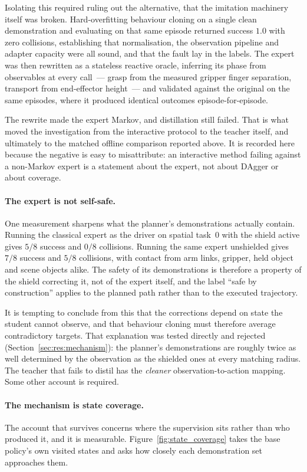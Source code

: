 \documentclass[a4paper,11pt]{report}
\begin{document}
Isolating this required ruling out the alternative, that the imitation machinery itself was broken.
Hard-overfitting behaviour cloning on a single clean demonstration and evaluating on that same
episode returned success $1.0$ with zero collisions, establishing that normalisation, the
observation pipeline and adapter capacity were all sound, and that the fault lay in the labels. The
expert was then rewritten as a stateless reactive oracle, inferring its phase from observables at
every call~--- grasp from the measured gripper finger separation, transport from end-effector
height~--- and validated against the original on the same episodes, where it produced identical
outcomes episode-for-episode.

The rewrite made the expert Markov, and distillation still failed. That is what moved the
investigation from the interactive protocol to the teacher itself, and ultimately to the matched
offline comparison reported above. It is recorded here because the negative is easy to misattribute:
an interactive method failing against a non-Markov expert is a statement about the expert, not about
DAgger or about coverage.

\paragraph{The expert is not self-safe.}
One measurement sharpens what the planner's demonstrations actually contain. Running the classical
expert as the driver on spatial task~0 with the shield active gives $5/8$ success and $0/8$
collisions. Running the same expert unshielded gives $7/8$ success and $5/8$ collisions, with
contact from arm links, gripper, held object and scene objects alike. The safety of its
demonstrations is therefore a property of the shield correcting it, not of the expert itself, and
the label ``safe by construction'' applies to the planned path rather than to the executed
trajectory.

It is tempting to conclude from this that the corrections depend on state the student cannot
observe, and that behaviour cloning must therefore average contradictory targets. That explanation
was tested directly and rejected (Section~\ref{sec:res:mechanism}): the planner's demonstrations
are roughly twice as well determined by the observation as the shielded ones at every matching
radius. The teacher that fails to distil has the \emph{cleaner} observation-to-action mapping. Some
other account is required.

\paragraph{The mechanism is state coverage.}
The account that survives concerns where the supervision sits rather than who produced it, and it
is measurable. Figure~\ref{fig:state_coverage} takes the base policy's own visited states and asks
how closely each demonstration set approaches them.
\end{document}
